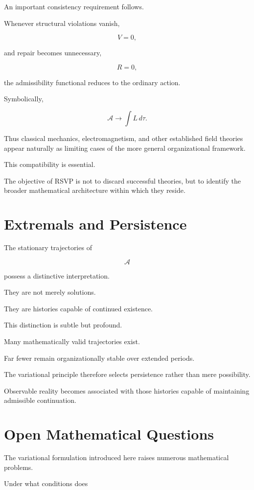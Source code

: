 \documentclass[11pt,oneside]{book}
\numberwithin{equation}{chapter}
\theoremstyle{definition}
\theoremstyle{plain}
\begin{document}
An important consistency requirement follows.

Whenever structural violations vanish,

\[
V=0,
\]

and repair becomes unnecessary,

\[
R=0,
\]

the admissibility functional reduces to the ordinary action.

Symbolically,

\[
\mathcal A
\longrightarrow
\int
L\,d\tau.
\]

Thus classical mechanics, electromagnetism, and other established field
theories appear naturally as limiting cases of the more general
organizational framework.

This compatibility is essential.

The objective of RSVP is not to discard successful theories, but to
identify the broader mathematical architecture within which they reside.

\section{Extremals and Persistence}

The stationary trajectories of

\[
\mathcal A
\]

possess a distinctive interpretation.

They are not merely solutions.

They are histories capable of continued existence.

This distinction is subtle but profound.

Many mathematically valid trajectories exist.

Far fewer remain organizationally stable over extended periods.

The variational principle therefore selects persistence rather than mere
possibility.

Observable reality becomes associated with those histories capable of
maintaining admissible continuation.

\section{Open Mathematical Questions}

The variational formulation introduced here raises numerous mathematical
problems.

Under what conditions does
\end{document}
